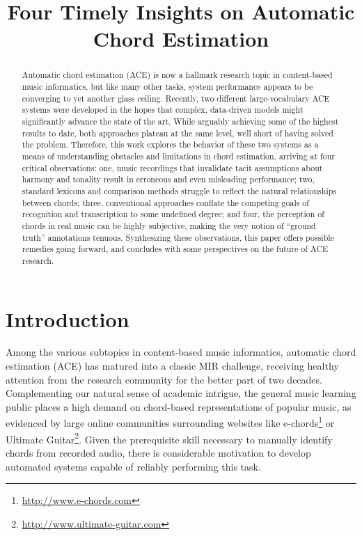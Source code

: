 \documentclass{article}
\title{Four Timely Insights on Automatic Chord Estimation}
\begin{document}
%
\maketitle
\sloppy
%
\begin{abstract}

Automatic chord estimation (ACE) is now a hallmark research topic in content-based music informatics, but like many other tasks, system performance appears to be converging to yet another glass ceiling.
Recently, two different large-vocabulary ACE systems were developed in the hopes that complex, data-driven models might significantly advance the state of the art.
While arguably achieving some of the highest results to date, both approaches plateau at the same level, well short of having solved the problem.
Therefore, this work explores the behavior of these two systems as a means of understanding obstacles and limitations in chord estimation, arriving at four critical observations:
one, music recordings that invalidate tacit assumptions about harmony and tonality result in erroneous and even misleading performance;
two, standard lexicons and comparison methods struggle to reflect the natural relationships between chords;
three, conventional approaches conflate the competing goals of recognition and transcription to some undefined degree;
and four, the perception of chords in real music can be highly subjective, making the very notion of ``ground truth'' annotations tenuous.
Synthesizing these observations, this paper offers possible remedies going forward, and concludes with some perspectives on the future of ACE research.

\end{abstract}


\section{Introduction}
\label{sec:introduction}

Among the various subtopics in content-based music informatics, automatic chord estimation (ACE) has matured into a classic MIR challenge, receiving healthy attention from the research community for the better part of two decades.
Complementing our natural sense of academic intrigue, the general music learning public places a high demand on chord-based representations of popular music, as evidenced by large online communities surrounding websites like e-chords\footnote{\url{http://www.e-chords.com}} or Ultimate Guitar\footnote{\url{http://www.ultimate-guitar.com}}.
Given the prerequisite skill necessary to manually identify chords from recorded audio, there is considerable motivation to develop automated systems capable of reliably performing this task.
\end{document}
